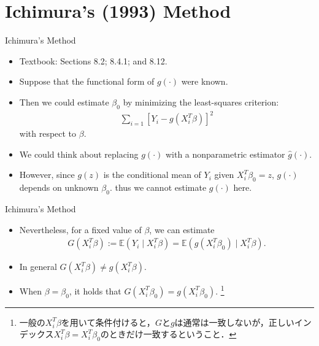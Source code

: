 \documentclass[xcolor=svgnames,dvipdfmx,cjk]{beamer}
\theoremstyle{example}
\begin{document}
\section{Ichimura's (1993) Method}


\begin{frame}{Ichimura's Method}
\begin{itemize}
  \item Textbook: Sections 8.2; 8.4.1; and 8.12.
  \item Suppose that the functional form of $g(\cdot)$ were known.
  \item Then we could estimate $\beta_0$ by minimizing the least-squares criterion:
        \begin{align*}
        \sum_{i=1} \left[ Y_i - g(X_i^{T}\beta) \right]^2
        \end{align*}
        with respect to $\beta$.
  \item We could think about replacing $g(\cdot)$ with a nonparametric estimator $\hat{g}(\cdot)$.
  \item However, since $g(z)$ is the conditional mean of $Y_i$ given $X_i^{T} \beta_0 = z$,
        \alert{$g(\cdot)$ depends on unknown $\beta_0$}. thus we cannot estimate $g(\cdot)$ here.
\end{itemize}
\end{frame}

\begin{frame}{Ichimura's Method}
\begin{itemize}
  \item Nevertheless, \alert{for a fixed value of $\beta$}, we can estimate
        \begin{align*}
        G(X_i^{T} \beta) 
          := \mathbb{E} (Y_i \mid X_i^{T}\beta) 
           = \mathbb{E} (g(X_i^{T}\beta_0) \mid X_i^{T}\beta).
        \end{align*}
  \item In general $G(X_i^{T}\beta) \neq g(X_i^{T} \beta)$.
  \item When $\beta = \beta_0$,
        it holds that $G(X_i^{T}\beta_0) = g(X_i^{T} \beta_0)$.
        \footnote{一般の$X_i^{T}\beta$を用いて条件付けると，$G$と$g$は通常は一致しないが，正しいインデックス$X_i^{T}\beta = X_i^{T}\beta_0$のときだけ一致するということ．}
\end{itemize}  
\end{frame}
\end{document}
